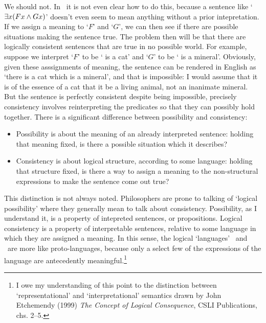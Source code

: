 We should not. In \FOL\ it is not even clear how to do this, because a sentence like `$\exists x (Fx \wedge Gx)$' doesn't even seem to mean anything without a prior intepretation. If we assign a meaning to `$F$' and `$G$', we can then see if there are possible situations making the sentence true. The problem then will be that there are logically consistent sentences that are true in no possible world. For example, suppose we interpret `$F$' to be `\gap{} is a cat' and `$G$' to be `\gap{} is a mineral'. Obviously, given these asssignments of meaning, the sentence can be rendered in English as `there is a cat which is a mineral', and that is impossible: I would assume that it is of the essence of a cat that it be a living animal, not an inanimate mineral. But the sentence is perfectly consistent despite being impossible, precisely consistency involves reinterpreting the predicates so that they can possibly hold together. There is a significant difference between possibility and consistency: \begin{itemize}
	\item Possibility is about the meaning of an already interpreted sentence: holding that meaning fixed, is there a possible situation which it describes?
	\item Consistency is about logical structure, according to some language: holding that structure fixed, is there a way to assign a meaning to the non-structural expressions to make the sentence come out true?
\end{itemize} This distinction is not always noted. Philosophers are prone to talking of `logical possibility' where they generally mean to talk about consistency. Possibility, as I understand it, is a property of intepreted sentences, or propositions. Logical consistency is a property of interpretable sentences, relative to some language in which they are assigned a meaning. In this sense, the logical `languages' \TFL\ and \FOL\ are more like proto-languages, because only a select few of the expressions of the language are antecedently meaningful.\footnote{I owe my understanding of this point to the distinction between `representational' and `interpretational' semantics drawn by John Etchemendy (1999) \emph{The Concept of Logical Consequence}, CSLI Publications, chs. 2–5.}



